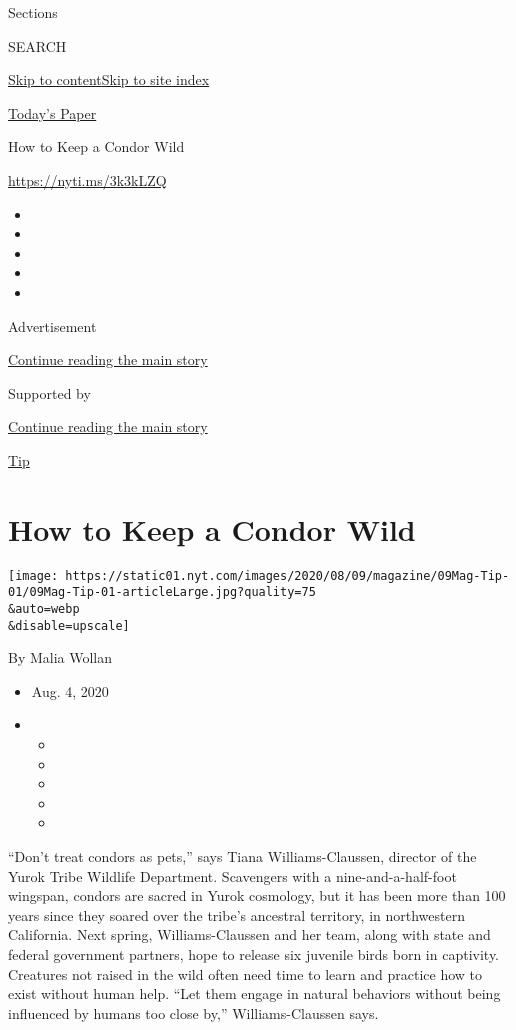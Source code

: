 Sections

SEARCH

\protect\hyperlink{site-content}{Skip to
content}\protect\hyperlink{site-index}{Skip to site index}

\href{https://myaccount.nytimes.com/auth/login?response_type=cookie\&client_id=vi}{}

\href{https://www.nytimes.com/section/todayspaper}{Today's Paper}

How to Keep a Condor Wild

\url{https://nyti.ms/3k3kLZQ}

\begin{itemize}
\item
\item
\item
\item
\item
\end{itemize}

Advertisement

\protect\hyperlink{after-top}{Continue reading the main story}

Supported by

\protect\hyperlink{after-sponsor}{Continue reading the main story}

\href{/column/magazine-tip}{Tip}

\hypertarget{how-to-keep-a-condor-wild}{%
\section{How to Keep a Condor Wild}\label{how-to-keep-a-condor-wild}}

\texttt{[image: https://static01.nyt.com/images/2020/08/09/magazine/09Mag-Tip-01/09Mag-Tip-01-articleLarge.jpg?quality=75\\\&auto=webp\\\&disable=upscale]}

By Malia Wollan

\begin{itemize}
\item
  Aug. 4, 2020
\item
  \begin{itemize}
  \item
  \item
  \item
  \item
  \item
  \end{itemize}
\end{itemize}

``Don't treat condors as pets,'' says Tiana Williams-Claussen, director
of the Yurok Tribe Wildlife Department. Scavengers with a
nine-and-a-half-foot wingspan, condors are sacred in Yurok cosmology,
but it has been more than 100 years since they soared over the tribe's
ancestral territory, in northwestern California. Next spring,
Williams-Claussen and her team, along with state and federal government
partners, hope to release six juvenile birds born in captivity.
Creatures not raised in the wild often need time to learn and practice
how to exist without human help. ``Let them engage in natural behaviors
without being influenced by humans too close by,'' Williams-Claussen
says.

